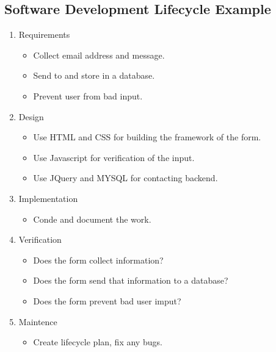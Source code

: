 \documentclass{article}
\begin{document}
    \subsection{Software Development Lifecycle Example}

        \begin{enumerate}
            \item Requirements
                \begin{itemize}
                    \item Collect email address and message.
                    \item Send to and store in a database.
                    \item Prevent user from bad input.
                \end{itemize}
            \item Design
                \begin{itemize}
                    \item Use HTML and CSS for building the framework of the form.
                    \item Use Javascript for verification of the input.
                    \item Use JQuery and MYSQL for contacting backend.
                \end{itemize}
            \item Implementation
                \begin{itemize}
                    \item Conde and document the work.
                \end{itemize}
            \item Verification
                \begin{itemize}
                    \item Does the form collect information?
                    \item Does the form send that information to a database?
                    \item Does the form prevent bad user imput?
                \end{itemize}
            \item Maintence
                \begin{itemize}
                    \item Create lifecycle plan, fix any bugs.
                \end{itemize}
        \end{enumerate}
\end{document}
